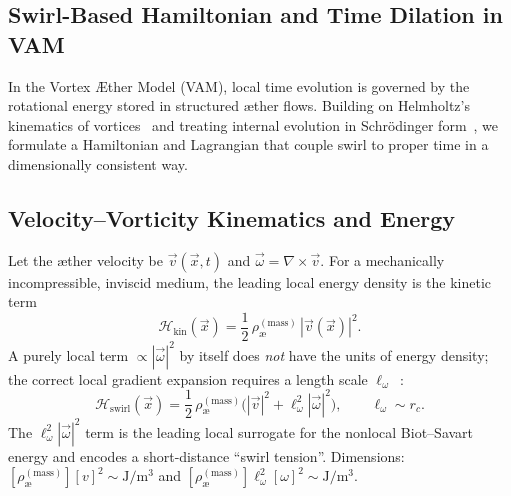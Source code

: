 \documentclass[12pt]{article}
\newcommand{\rc}{r_c}
\newcommand{\rhoa}{\rho_{\text{\ae}}^{(\text{mass})}}
\begin{document}
    \begin{tcolorbox}[enhanced, breakable, sharp corners, colback=gray!2, colframe=black!40, title={Swirl-Based Hamiltonian, Time Dilation, and Emergent Geometry in VAM}]

        \section{Swirl-Based Hamiltonian and Time Dilation in VAM}
        \label{sec:swirl_hamiltonian}

        In the Vortex \AE{}ther Model (VAM), local time evolution is governed by the rotational energy stored in structured æther flows. Building on Helmholtz’s kinematics of vortices~\cite{Helmholtz1858} and treating internal evolution in Schr\"odinger form~\cite{Schrodinger1926}, we formulate a Hamiltonian and Lagrangian that couple swirl to proper time in a dimensionally consistent way.

        \subsection{Velocity–Vorticity Kinematics and Energy}
        \label{subsec:kin_energy}

        Let the æther velocity be \(\vec{v}(\vec{x},t)\) and \(\vec{\omega}=\nabla\times\vec{v}\). For a mechanically incompressible, inviscid medium, the leading local energy density is the kinetic term
        \begin{equation}
            \mathcal{H}_{\text{kin}}(\vec{x})=\frac{1}{2}\,\rhoa\,|\vec{v}(\vec{x})|^{2}.
        \end{equation}
        A purely local term \(\propto|\vec{\omega}|^{2}\) by itself does \emph{not} have the units of energy density; the correct local gradient expansion requires a length scale \(\ell_\omega\)~\cite{Saffman1992,ChorinMarsden1993}:
        \begin{equation}
            \mathcal{H}_{\text{swirl}}(\vec{x})=\frac{1}{2}\,\rhoa\Big(|\vec{v}|^{2}+\ell_\omega^{2}|\vec{\omega}|^{2}\Big),\qquad
            \ell_\omega\sim \rc.
            \label{eq:H_swirl_local}
        \end{equation}
        The \(\ell_\omega^2|\vec{\omega}|^2\) term is the leading local surrogate for the nonlocal Biot–Savart energy and encodes a short-distance “swirl tension”. Dimensions: \([\rhoa][v]^2\sim\mathrm{J/m^3}\) and \([\rhoa]\ell_\omega^2[\omega]^2\sim\mathrm{J/m^3}\).


\end{tcolorbox}
\end{document}
